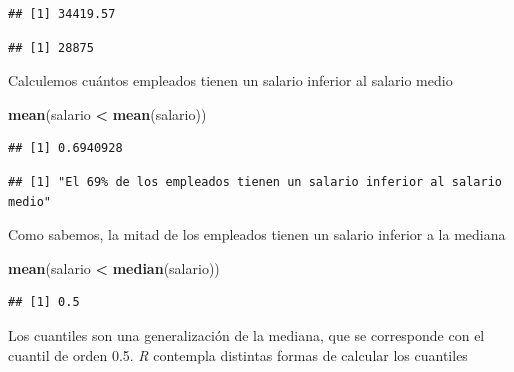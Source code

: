 \documentclass[]{book}
\newenvironment{Shaded}{\begin{snugshade}}{\end{snugshade}}
\newcommand{\KeywordTok}[1]{\textcolor[rgb]{0.13,0.29,0.53}{\textbf{#1}}}
\newcommand{\DataTypeTok}[1]{\textcolor[rgb]{0.13,0.29,0.53}{#1}}
\newcommand{\DecValTok}[1]{\textcolor[rgb]{0.00,0.00,0.81}{#1}}
\newcommand{\StringTok}[1]{\textcolor[rgb]{0.31,0.60,0.02}{#1}}
\newcommand{\OperatorTok}[1]{\textcolor[rgb]{0.81,0.36,0.00}{\textbf{#1}}}
\newcommand{\NormalTok}[1]{#1}
\begin{document}
\begin{verbatim}
## [1] 34419.57
\end{verbatim}

\begin{verbatim}
## [1] 28875
\end{verbatim}

Calculemos cuántos empleados tienen un salario inferior al salario medio

\begin{Shaded}
\begin{Highlighting}[]
\KeywordTok{mean}\NormalTok{(salario }\OperatorTok{<}\StringTok{ }\KeywordTok{mean}\NormalTok{(salario))}
\end{Highlighting}
\end{Shaded}

\begin{verbatim}
## [1] 0.6940928
\end{verbatim}

\begin{Shaded}
\end{Shaded}

\begin{verbatim}
## [1] "El 69% de los empleados tienen un salario inferior al salario medio"
\end{verbatim}

Como sabemos, la mitad de los empleados tienen un salario inferior a la
mediana

\begin{Shaded}
\begin{Highlighting}[]
\KeywordTok{mean}\NormalTok{(salario }\OperatorTok{<}\StringTok{ }\KeywordTok{median}\NormalTok{(salario))}
\end{Highlighting}
\end{Shaded}

\begin{verbatim}
## [1] 0.5
\end{verbatim}

Los cuantiles son una generalización de la mediana, que se corresponde
con el cuantil de orden 0.5. \emph{R} contempla distintas formas de
calcular los cuantiles
\end{document}
